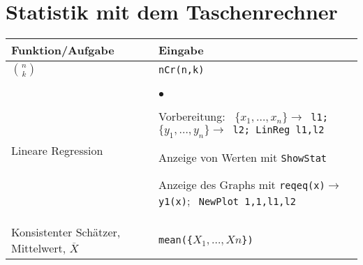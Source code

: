 \section{Statistik mit dem Taschenrechner}

\begin{center}
\begin{tabular}{|p{4cm}|p{11cm}|}
\hline
\textbf{Funktion/Aufgabe} & \textbf{Eingabe} \\
\hline

$\binom{n}{k}$ & \tt{nCr(n,k)} \\
\hline

Lineare Regression &     
\begin{list}{$\bullet$}{\setlength{\itemsep}{0cm}
	\setlength{\parsep}{0cm} \setlength{\topsep}{0cm}}  
	\item Vorbereitung:\newline
		\texttt{
			$\{x_1, \ldots, x_n\} \rightarrow$ l1;
			$\{y_1, \ldots, y_n\} \rightarrow$ l2;
			LinReg l1,l2}
	 \item Anzeige von Werten mit \newline \texttt{ShowStat}
	 \item Anzeige des Graphs mit \newline
	 	\texttt{reqeq(x)}$\rightarrow$\texttt{y1(x)}$; \;$
	    \texttt{NewPlot 1,1,l1,l2}
\end{list} \\
\hline

Konsistenter Schätzer, Mittelwert, $\overline{X}$ &
\tt{mean(\{}$X_1,\ldots,Xn$\tt{\})} \\
\hline


\end{tabular}
\end{center}